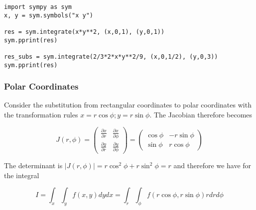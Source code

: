 \begin{verbatim}
import sympy as sym
x, y = sym.symbols("x y")

res = sym.integrate(x*y**2, (x,0,1), (y,0,1))
sym.pprint(res)

res_subs = sym.integrate(2/3*2*x*y**2/9, (x,0,1/2), (y,0,3))
sym.pprint(res)
\end{verbatim}

\subsubsection{Polar Coordinates}

Consider the substitution from rectangular coordinates to polar
coordinates with the transformation rules $x = r \cos \phi; y = r \sin \phi $. The Jacobian therefore becomes

\[J(r, \phi) = \left( \begin{array}{cc} \frac{\partial x}{\partial r} & \frac{\partial x}{\partial \phi} \\ \frac{\partial y}{\partial r} & \frac{\partial y}{\partial \phi} \end{array} \right)
 = \left( \begin{array}{cc} \cos \phi & -r \sin \phi \\ \sin \phi & r \cos \phi \end{array} \right) \]

The determinant is $|J(r, \phi)| = r \cos^2 \phi + r \sin^2 \phi = r$ and therefore we have for the integral

\[ I = \int_x \int_y f(x,y) dy dx = \int_r \int_\phi f(r \cos\phi, r \sin\phi) r dr d\phi \]
